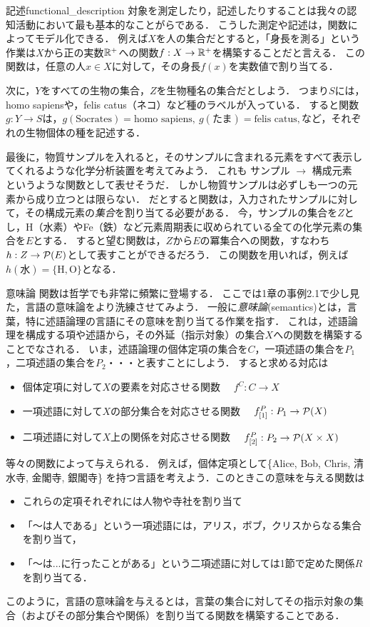 \documentclass[11pt,a4paper]{bxjsarticle}
\begin{document}
\begin{rei}{記述}{functional_description}
 対象を測定したり，記述したりすることは我々の認知活動において最も基本的なことがらである．
 こうした測定や記述は，関数によってモデル化できる．
 例えば$X$を人の集合だとすると，「身長を測る」という作業は$X$から正の実数$\mathbb{R}^+$への関数$f:X \to \mathbb{R}^+$を構築することだと言える．
 この関数は，任意の人$x \in X$に対して，その身長$f(x)$を実数値で割り当てる．

 次に，$Y$をすべての生物の集合，$Z$を生物種名の集合だとしよう．
 つまり$S$には，homo sapiensや，felis catus（ネコ）など種のラベルが入っている．
 すると関数$g: Y \to S$は，$g(\text{Socrates}) = \text{homo sapiens}, \ g(\text{たま}) = \text{felis catus}, $など，それぞれの生物個体の種を記述する．

 最後に，物質サンプルを入れると，そのサンプルに含まれる元素をすべて表示してくれるような化学分析装置を考えてみよう．
 これも サンプル $\rightarrow$ 構成元素 というような関数として表せそうだ．
 しかし物質サンプルは必ずしも一つの元素から成り立つとは限らない．
 だとすると関数は，入力されたサンプルに対して，その構成元素の\emph{集合}を割り当てる必要がある．
 今，サンプルの集合を$Z$とし，H（水素）やFe（鉄）など元素周期表に収められている全ての化学元素の集合を$E$とする．
 すると望む関数は，$Z$から$E$の冪集合への関数，すなわち$h:Z \to \mathcal{P}(E)$として表すことができるだろう．
 この関数を用いれば，例えば$h(\text{水}) = \{ \text{H}, \text{O}\}$となる．
\end{rei}

\begin{rei}{意味論}{}
関数は哲学でも非常に頻繁に登場する．
ここでは1章の事例2.1で少し見た，言語の意味論をより洗練させてみよう．
一般に\emph{意味論}(semantics)とは，言葉，特に述語論理の言語にその意味を割り当てる作業を指す．
これは，述語論理を構成する項や述語から，その外延（指示対象）の集合$X$への関数を構築することでなされる．
いま，述語論理の個体定項の集合を$C$，一項述語の集合を$P_1$，二項述語の集合を$P_2$・・・と表すことにしよう．
すると求める対応は
\begin{itemize}
 \item 個体定項に対して$X$の要素を対応させる関数 \ \ $f^C: C \to X$
 \item 一項述語に対して$X$の部分集合を対応させる関数 \ \ $f^P_{[1]}: P_1 \to \mathcal{P}(X)$
 \item 二項述語に対して$X$上の関係を対応させる関数 \ \ $f^P_{[2]}: P_2 \to \mathcal{P}(X \times X)$
\end{itemize}
等々の関数によって与えられる．
例えば，個体定項として\{Alice, Bob, Chris, 清水寺, 金閣寺, 銀閣寺\} を持つ言語を考えよう．このときこの意味を与える関数は
\begin{itemize}
 \item これらの定項それぞれには人物や寺社を割り当て
 \item 「〜は人である」という一項述語には，アリス，ボブ，クリスからなる集合を割り当て，
 \item 「〜は...に行ったことがある」という二項述語に対しては1節で定めた関係$R$を割り当てる．
\end{itemize}
このように，言語の意味論を与えるとは，言葉の集合に対してその指示対象の集合（およびその部分集合や関係）を割り当てる関数を構築することである．
\end{rei}
\end{document}
